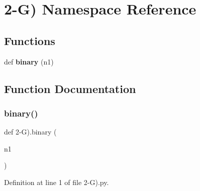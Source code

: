 \section{2-\/G) Namespace Reference}
\label{namespace2-_g_08}
\subsection*{Functions}
\begin{DoxyCompactItemize}
\item 
def \textbf{ binary} (n1)
\end{DoxyCompactItemize}


\subsection{Function Documentation}
\mbox{\label{namespace2-_g_08_a2ae65591abea4589a6eb05390f047cb7}} 
\subsubsection{binary()}
{\footnotesize\ttfamily def 2-\/G).binary (\begin{DoxyParamCaption}\item[{}]{n1 }\end{DoxyParamCaption})}



Definition at line 1 of file 2-\/\+G).\+py.

